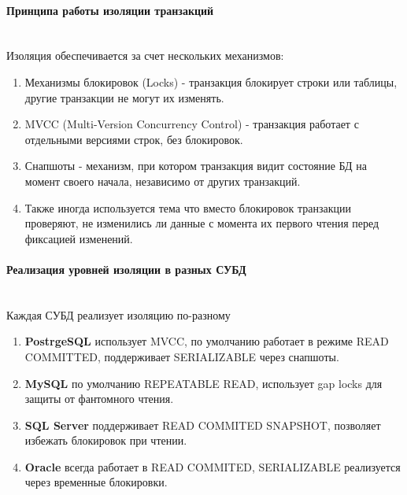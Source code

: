  \paragraph{Принципа работы изоляции транзакций} ~\\

 Изоляция обеспечивается за счет нескольких механизмов:
 \begin{enumerate}
     \item Механизмы блокировок (Locks) - транзакция блокирует строки или таблицы, другие транзакции не могут их изменять.
     \item MVCC (Multi-Version Concurrency Control) - транзакция работает с отдельными версиями строк, без блокировок.
     \item Снапшоты - механизм, при котором транзакция видит состояние БД на момент своего начала, независимо от других транзакций.
     \item Также иногда используется тема что вместо блокировок транзакции проверяют, не изменились ли данные с момента их первого чтения перед фиксацией изменений.
 \end{enumerate}
 
 \paragraph{Реализация уровней изоляции в разных СУБД} ~\\
 
 Каждая СУБД реализует изоляцию по-разному \autocites[§2]{PostgreSQLdocc13}[§17.7.2.1]{Mysqldoc4}{MicrosoftLearnSQLserverIsolation}{oracledbdoc5}
 
 \begin{enumerate}
     \item \textbf{PostrgeSQL} использует MVCC, по умолчанию работает в режиме READ COMMITTED, поддерживает SERIALIZABLE через снапшоты.
     \item \textbf{MySQL} по умолчанию REPEATABLE READ, использует gap locks для защиты от фантомного чтения.
     \item \textbf{SQL Server} поддерживает READ COMMITED SNAPSHOT, позволяет избежать блокировок при чтении.
     \item \textbf{Oracle} всегда работает в READ COMMITED, SERIALIZABLE реализуется через временные блокировки.
 \end{enumerate}
 
